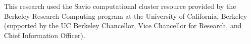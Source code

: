 \documentclass[3p]{elsarticle}
\newcommand{\comment}[1]{\todo[color=blue!20!white,inline]{ASV: #1}}
\begin{document}
 
This research used the Savio computational cluster resource provided by the Berkeley Research Computing program at the University of California, Berkeley (supported by the UC Berkeley Chancellor, Vice Chancellor for Research, and Chief Information Officer).

 


 
 
 
%  
\end{document}
